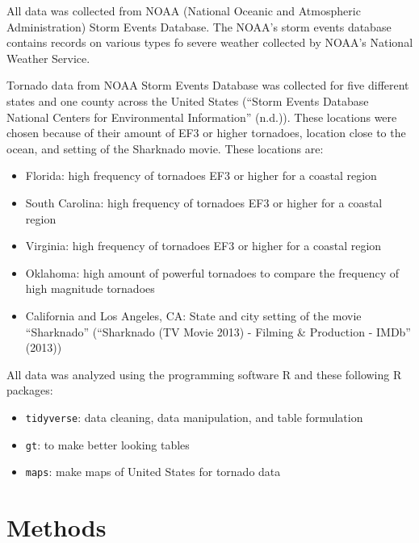 \documentclass[
  letterpaper,
  DIV=11,
  numbers=noendperiod]{scrreprt}
\begin{document}
All data was collected from NOAA (National Oceanic and Atmospheric
Administration) Storm Events Database. The NOAA's storm events database
contains records on various types fo severe weather collected by NOAA's
National Weather Service.

Tornado data from NOAA Storm Events Database was collected for five
different states and one county across the United States ({``Storm
Events Database {\textbar} National Centers for Environmental
Information''} (n.d.)). These locations were chosen because of their
amount of EF3 or higher tornadoes, location close to the ocean, and
setting of the Sharknado movie. These locations are:

\begin{itemize}
\item
  Florida: high frequency of tornadoes EF3 or higher for a coastal
  region
\item
  South Carolina: high frequency of tornadoes EF3 or higher for a
  coastal region
\item
  Virginia: high frequency of tornadoes EF3 or higher for a coastal
  region
\item
  Oklahoma: high amount of powerful tornadoes to compare the frequency
  of high magnitude tornadoes
\item
  California and Los Angeles, CA: State and city setting of the movie
  ``Sharknado'' ({``Sharknado ({TV} Movie 2013) - Filming \& Production
  - {IMDb}''} (2013))
\end{itemize}

All data was analyzed using the programming software R and these
following R packages:

\begin{itemize}
\item
  \texttt{tidyverse}: data cleaning, data manipulation, and table
  formulation
\item
  \texttt{gt}: to make better looking tables
\item
  \texttt{maps}: make maps of United States for tornado data
\end{itemize}


\chapter{Methods}\label{methods-1}
\end{document}
